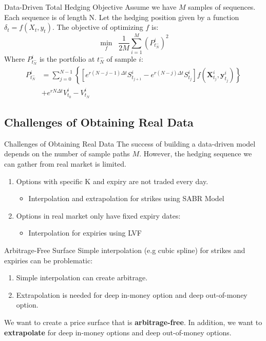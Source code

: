 \documentclass[10pt,table,mathserif]{beamer}
\newcommand{\vy}{\mathbf{y}}
\begin{document}
\begin{frame}{Data-Driven Total Hedging Objective}
Assume we have $M$ samples of sequences. Each sequence is of length N. Let the hedging position given by a function $\delta_t = f (X_t,y_t)$.
The objective of optimizing $f$ is:
\[
\min_{f} \;\;\frac{1}{2 M} \sum_{i=1}^M (P^i_{t_N^-})^2
\]
Where $P^i_{t_N^-}$ is the portfolio at $t_N^-$ of sample $i$:
\[ \begin{split}
P^i_{t_N^-} &=\sum_{j=0}^{N-1}\left\{ \left[e^{r (N-j-1) \Delta t} S^i_{t_{j+1}}-e^{r (N-j) \Delta t}S^i_{t_{j}}\right] f(\mathbf{X}^i_{t_j},\vy^i_{t_{j}})\right\}\\
&+e^{r N \Delta t} V^i_{t_0}-V^i_{t_N}
\end{split}
\]
\end{frame}

\subsection{Challenges of Obtaining Real Data}
\begin{frame}{Challenges of Obtaining Real Data}
The success of building a data-driven model depends on the number of sample paths $M$. However, the hedging sequence we can gather from real market is limited.
\begin{enumerate}
	\item Options with specific K and expiry are not traded every day.
	\begin{itemize}
		\item Interpolation and extrapolation for strikes using SABR Model
	\end{itemize}
	\item Options in real market only have fixed expiry dates:
		\begin{itemize}
		\item Interpolation for expiries using LVF
	    \end{itemize}
\end{enumerate}
\end{frame}


\begin{frame}{Arbitrage-Free Surface}
Simple interpolation (e.g cubic spline) for strikes and expiries can be problematic:
\begin{enumerate}
	\item Simple interpolation can create arbitrage.
	\item Extrapolation is needed for deep in-money option and deep out-of-money option.
	
\end{enumerate}
We want to create a price surface that is \textbf{arbitrage-free}. In addition, we want to \textbf{extrapolate} for deep in-money options and deep out-of-money options.
\end{frame}
\end{document}
